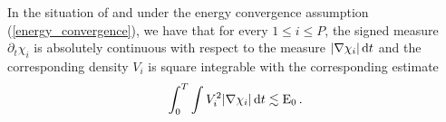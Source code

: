 \begin{proposition}
	\label{existence_and_square_integrability_of_velocities_multiphase}
	In the situation of  and under 
	the energy convergence assumption (\ref{energy_convergence}), we have that 
	for every $ 1 \leq i \leq P $, the signed measure $ \partial_{ t } \chi_{ i 
	} $ is absolutely continuous with respect to the measure $ \abs{ \nabla 
	\chi_{i } } \dd{ t } $ and the corresponding density $ V_{ i } $ is square 
	integrable with the corresponding estimate
	\begin{equation}
		\label{velocity_l2_estimate}
		\int_{ 0 }^{ T }
		\int
		V_{ i }^{ 2 }
		\abs{ \nabla \chi_{ i } }
		\dd{ t }
		\lesssim
		\operatorname{E}_{ 0 }.
	\end{equation}
\end{proposition}

